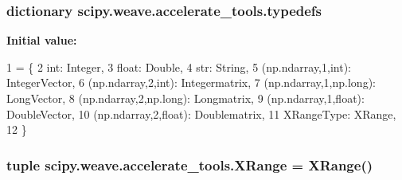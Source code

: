 \subsubsection[{typedefs}]{\setlength{\rightskip}{0pt plus 5cm}dictionary scipy.\+weave.\+accelerate\+\_\+tools.\+typedefs}\label{namespacescipy_1_1weave_1_1accelerate__tools_a34fa6c36bfe7fbb0803213bc6f19daa5}
{\bfseries Initial value\+:}
\begin{DoxyCode}
1 = \{
2     int: Integer,
3     float: Double,
4     str: String,
5     (np.ndarray,1,int): IntegerVector,
6     (np.ndarray,2,int): Integermatrix,
7     (np.ndarray,1,np.long): LongVector,
8     (np.ndarray,2,np.long): Longmatrix,
9     (np.ndarray,1,float): DoubleVector,
10     (np.ndarray,2,float): Doublematrix,
11     XRangeType: XRange,
12     \}
\end{DoxyCode}
\hypertarget{namespacescipy_1_1weave_1_1accelerate__tools_a545d3a0a108f6a00f8364ffaa2c7f6e1}{}
\subsubsection[{X\+Range}]{\setlength{\rightskip}{0pt plus 5cm}tuple {\bf scipy.\+weave.\+accelerate\+\_\+tools.\+X\+Range} = {\bf X\+Range}()}\label{namespacescipy_1_1weave_1_1accelerate__tools_a545d3a0a108f6a00f8364ffaa2c7f6e1}
